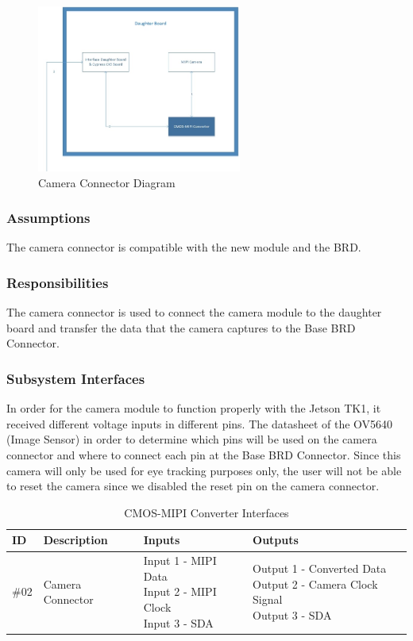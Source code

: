 \begin{figure}[h!]
	\centering
 	\includegraphics[width=0.60\textwidth]{images/DaughterBoard_converter}
 \caption{Camera Connector Diagram}
\end{figure}

\subsubsection{Assumptions}
The camera connector is compatible with the new module and the BRD.

\subsubsection{Responsibilities}
The camera connector is used to connect the camera module to the daughter board and transfer the data that the camera captures to the Base BRD Connector.

\subsubsection{Subsystem Interfaces}
In order for the camera module to function properly with the Jetson TK1, it received different voltage inputs in different pins. The datasheet of the OV5640 (Image Sensor) in order to determine which pins will be used on the camera connector and where to connect each pin at the Base BRD Connector. Since this camera will only be used for eye tracking purposes only, the user will not be able to reset the camera since we disabled the reset pin on the camera connector.

\begin {table}[H]
\caption {CMOS-MIPI Converter Interfaces}
\begin{center}
    \begin{tabular}{ | p{1cm} | p{6cm} | p{3cm} | p{3cm} |}
    \hline
    ID & Description & Inputs & Outputs \\ \hline
    \#02 & Camera Connector & \pbox{3cm}{Input 1 - MIPI Data \\ Input 2 - MIPI Clock \\ Input 3 - SDA} & \pbox{3cm}{Output 1 - Converted Data \\ Output 2 - Camera Clock Signal \\ Output 3 - SDA}  \\ \hline
    \end{tabular}
\end{center}
\end{table}
